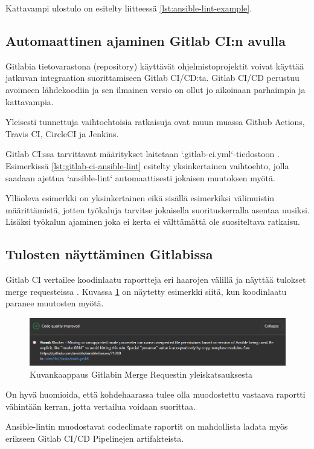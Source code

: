Kattavampi ulostulo on esitelty liitteessä \ref{lst:ansible-lint-example}.

\subsection{Automaattinen ajaminen Gitlab CI:n avulla}

Gitlabia tietovarastona (repository) käyttävät ohjelmistoprojektit voivat käyttää
jatkuvan integraation suorittamiseen Gitlab CI/CD:ta. Gitlab CI/CD perustuu
avoimeen lähdekoodiin ja sen ilmainen versio on ollut jo aikoinaan parhaimpia ja
kattavampia. \parencite{alma9911268330505973}

Yleisesti tunnettuja vaihtoehtoisia ratkaisuja ovat muun muassa Github Actions,
Travis CI, CircleCI ja Jenkins.

Gitlab CI:ssa tarvittavat määritykset laitetaan `.gitlab-ci.yml`-tiedostoon
\parencite{GitlabCICDDocs}. Esimerkissä \ref{lst:gitlab-ci-ansible-lint} esitelty
yksinkertainen vaihtoehto, jolla saadaan ajettua `ansible-lint` automaattisesti
jokaisen muutoksen myötä.



Ylläoleva esimerkki on yksinkertainen eikä sisällä esimerkiksi välimuistin
määrittämistä, jotten työkaluja tarvitse jokaisella suorituskerralla asentaa
uusiksi. Lisäksi työkalun ajaminen joka ei kerta ei välttämättä ole suositeltava
ratkaisu.

\subsection{Tulosten näyttäminen Gitlabissa}

Gitlab CI vertailee koodinlaatu raportteja eri haarojen välillä ja näyttää
tulokset merge requesteissa \parencite{GitlabCICDDocs}. Kuvassa
\ref{fig:gitlab-code-quality-improved} on näytetty esimerkki siitä, kun
koodinlaatu paranee muutosten myötä.

\begin{figure}[h!]
    \includegraphics[width=\textwidth]{figures/gitlab-code-quality-improved}
    \caption{Kuvankaappaus Gitlabin Merge Requestin yleiskatsauksesta}
    \label{fig:gitlab-code-quality-improved}
\end{figure}

On hyvä huomioida, että kohdehaarassa tulee olla muodostettu vastaava
raportti vähintään kerran, jotta vertailua voidaan suorittaa. \parencite{GitlabCICDDocs}

Ansible-lintin muodostavat codeclimate raportit on mahdollista ladata myös
erikseen Gitlab CI/CD Pipelinejen artifakteista. \parencite{GitlabCICDDocs}
